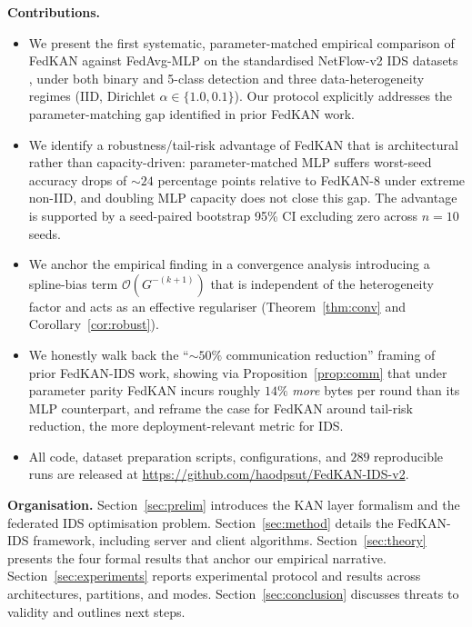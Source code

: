 \textbf{Contributions.}
\begin{itemize}
\item We present the first systematic, parameter-matched empirical comparison of FedKAN against FedAvg-MLP on the standardised NetFlow-v2 IDS datasets \cite{sarhan2022standard}, under both binary and 5-class detection and three data-heterogeneity regimes (IID, Dirichlet $\alpha\in\{1.0, 0.1\}$). Our protocol explicitly addresses the parameter-matching gap identified in prior FedKAN work.
\item We identify a robustness/tail-risk advantage of FedKAN that is architectural rather than capacity-driven: parameter-matched MLP suffers worst-seed accuracy drops of $\sim 24$ percentage points relative to FedKAN-8 under extreme non-IID, and doubling MLP capacity does not close this gap. The advantage is supported by a seed-paired bootstrap 95\% CI excluding zero across $n=10$ seeds.
\item We anchor the empirical finding in a convergence analysis introducing a spline-bias term $\mathcal{O}(G^{-(k+1)})$ that is independent of the heterogeneity factor and acts as an effective regulariser (Theorem~\ref{thm:conv} and Corollary~\ref{cor:robust}).
\item We honestly walk back the ``$\sim 50\%$ communication reduction'' framing of prior FedKAN-IDS work, showing via Proposition~\ref{prop:comm} that under parameter parity FedKAN incurs roughly $14\%$ \emph{more} bytes per round than its MLP counterpart, and reframe the case for FedKAN around tail-risk reduction, the more deployment-relevant metric for IDS.
\item All code, dataset preparation scripts, configurations, and $289$ reproducible runs are released at \url{https://github.com/haodpsut/FedKAN-IDS-v2}.
\end{itemize}

\textbf{Organisation.} Section~\ref{sec:prelim} introduces the KAN layer formalism and the federated IDS optimisation problem. Section~\ref{sec:method} details the FedKAN-IDS framework, including server and client algorithms. Section~\ref{sec:theory} presents the four formal results that anchor our empirical narrative. Section~\ref{sec:experiments} reports experimental protocol and results across architectures, partitions, and modes. Section~\ref{sec:conclusion} discusses threats to validity and outlines next steps.
